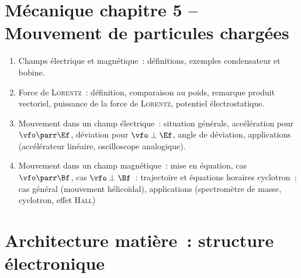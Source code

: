 \documentclass[a4paper, 12pt, final, garamond]{book}
\begin{document}
\section*{Mécanique chapitre 5 -- Mouvement de particules chargées}
\begin{enumerate}[label=\Roman*]
    \item{Champs électrique et magnétique}~: définitions, exemples condensateur
        et bobine.
    \item{Force de \textsc{Lorentz}}~: définition, comparaison au poids,
        remarque produit vectoriel, puissance de la force de \textsc{Lorentz},
        potentiel électrostatique.
    \item{Mouvement dans un champ électrique}~: situation générale, accélération
        pour $\vfo\parr\Ef$, déviation pour $\vfo\perp\Ef$, angle de déviation,
        applications (accélérateur linéaire, oscilloscope analogique).
    \item{Mouvement dans un champ magnétique}~: mise en équation, cas
        $\vfo\parr\Bf$, cas $\vfo\perp\Bf$~: trajectoire et équations horaires
        cyclotron~; cas général (mouvement hélicoïdal), applications
        (spectromètre de masse, cyclotron, effet \textsc{Hall})
\end{enumerate}

\section*{Architecture matière~: structure électronique}
\begin{enumerate}[label=\Roman*]
    \item{
\end{enumerate}
\end{document}
